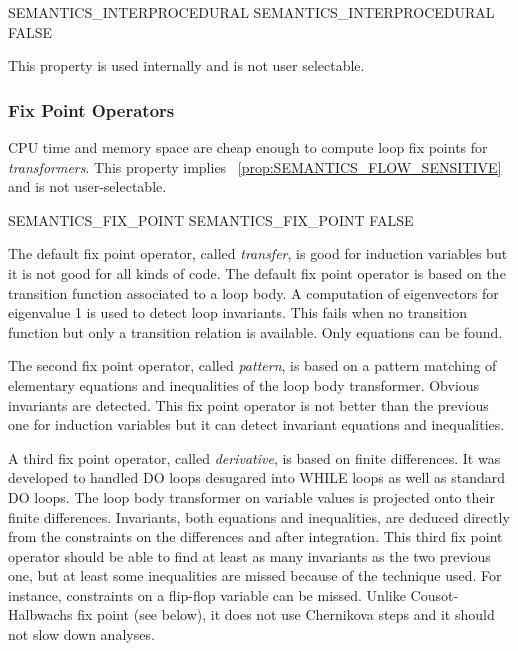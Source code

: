 \documentclass[a4paper]{report}
\newcommand{\PipsPropRef}[1]{\texttt{\detokenize{#1}}~\ref{prop:#1}}
\begin{document}
\begin{PipsProp}{SEMANTICS_INTERPROCEDURAL}
SEMANTICS_INTERPROCEDURAL FALSE
\end{PipsProp}

This property is used internally and is not user selectable.

\subsubsection{Fix Point Operators}

CPU time and memory space are cheap enough to compute loop fix points
for {\em transformers}. This property implies
\PipsPropRef{SEMANTICS_FLOW_SENSITIVE} and is not user-selectable.

\begin{PipsProp}{SEMANTICS_FIX_POINT}
SEMANTICS_FIX_POINT FALSE
\end{PipsProp}

The default fix point operator, called {\em transfer}, is good for
induction variables but it is not good for all kinds of code. The default
fix point operator is based on the transition function associated to a
loop body. A computation of eigenvectors for eigenvalue 1 is used to
detect loop invariants. This fails when no transition function but only a
transition relation is available. Only equations can be found.

The second fix point operator, called {\em pattern}, is based on a pattern
matching of elementary equations and inequalities of the loop body
transformer. Obvious invariants are detected. This fix point operator is
not better than the previous one for induction variables but it can detect
invariant equations and inequalities.

A third fix point operator, called {\em derivative}, is based on finite
differences. It was developed to handled DO loops desugared into WHILE
loops as well as standard DO loops. The loop body transformer on variable
values is projected onto their finite differences. Invariants, both
equations and inequalities, are deduced directly from the constraints on
the differences and after integration. This third fix point operator
should be able to find at least as many invariants as the two previous
one, but at least some inequalities are missed because of the technique
used. For instance, constraints on a flip-flop variable can be missed.
Unlike Cousot-Halbwachs fix point (see below), it does not use Chernikova
steps and it should not slow down analyses.
\end{document}
